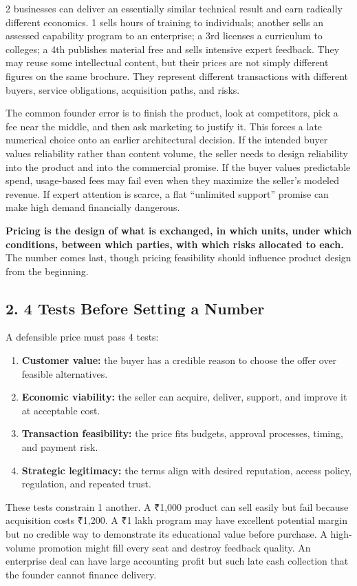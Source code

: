 2 businesses can deliver an essentially similar technical result and earn radically different economics. 1 sells hours of training to individuals; another sells an assessed capability program to an enterprise; a 3rd licenses a curriculum to colleges; a 4th publishes material free and sells intensive expert feedback. They may reuse some intellectual content, but their prices are not simply different figures on the same brochure. They represent different transactions with different buyers, service obligations, acquisition paths, and risks.

The common founder error is to finish the product, look at competitors, pick a fee near the middle, and then ask marketing to justify it. This forces a late numerical choice onto an earlier architectural decision. If the intended buyer values reliability rather than content volume, the seller needs to design reliability into the product and into the commercial promise. If the buyer values predictable spend, usage-based fees may fail even when they maximize the seller's modeled revenue. If expert attention is scarce, a flat ``unlimited support'' promise can make high demand financially dangerous.

\textbf{Pricing is the design of what is exchanged, in which units, under which conditions, between which parties, with which risks allocated to each.} The number comes last, though pricing feasibility should influence product design from the beginning.

\subsection*{2. 4 Tests Before Setting a Number}

A defensible price must pass 4 tests:
\begin{enumerate}
  \item \textbf{Customer value:} the buyer has a credible reason to choose the offer over feasible alternatives.
  \item \textbf{Economic viability:} the seller can acquire, deliver, support, and improve it at acceptable cost.
  \item \textbf{Transaction feasibility:} the price fits budgets, approval processes, timing, and payment risk.
  \item \textbf{Strategic legitimacy:} the terms align with desired reputation, access policy, regulation, and repeated trust.
\end{enumerate}

These tests constrain 1 another. A ₹1,000 product can sell easily but fail because acquisition costs ₹1,200. A ₹1 lakh program may have excellent potential margin but no credible way to demonstrate its educational value before purchase. A high-volume promotion might fill every seat and destroy feedback quality. An enterprise deal can have large accounting profit but such late cash collection that the founder cannot finance delivery.


